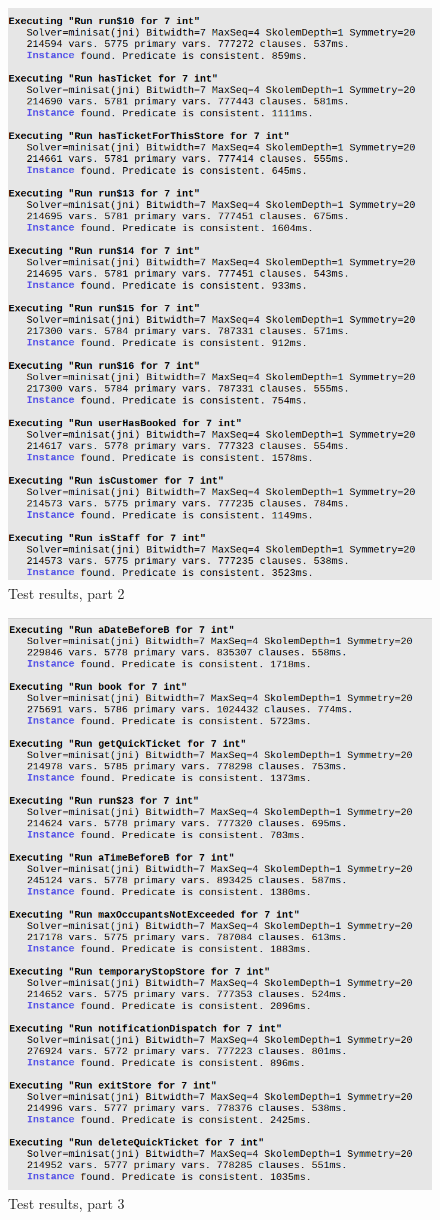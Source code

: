 \begin{figure} [H]
	\includegraphics[width=\linewidth]{../Alloy/alloy_result2.png}
	\caption{Test results, part 2}
	\label{fig:results2}
\end{figure}
\begin{figure} [H]
	\includegraphics[width=\linewidth]{../Alloy/alloy_result3.png}
	\caption{Test results, part 3}
	\label{fig:results3}
\end{figure}
